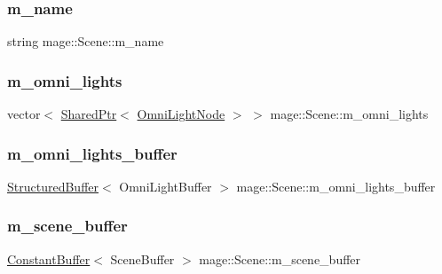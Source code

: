 \subsubsection{\texorpdfstring{m\+\_\+name}{m\_name}}
{\footnotesize\ttfamily string mage\+::\+Scene\+::m\+\_\+name\hspace{0.3cm}{\ttfamily [private]}}

\hypertarget{classmage_1_1_scene_a881c3dd7e85e5069650f29fd2722bf78}{}\label{classmage_1_1_scene_a881c3dd7e85e5069650f29fd2722bf78} 
\subsubsection{\texorpdfstring{m\+\_\+omni\+\_\+lights}{m\_omni\_lights}}
{\footnotesize\ttfamily vector$<$ \hyperlink{namespacemage_a1e01ae66713838a7a67d30e44c67703e}{Shared\+Ptr}$<$ \hyperlink{namespacemage_a1724c6e6b6b5ba535cdd967cbbb4a669}{Omni\+Light\+Node} $>$ $>$ mage\+::\+Scene\+::m\+\_\+omni\+\_\+lights\hspace{0.3cm}{\ttfamily [private]}}

\hypertarget{classmage_1_1_scene_a274ed5e548431ba805513a86a00bbaf1}{}\label{classmage_1_1_scene_a274ed5e548431ba805513a86a00bbaf1} 
\subsubsection{\texorpdfstring{m\+\_\+omni\+\_\+lights\+\_\+buffer}{m\_omni\_lights\_buffer}}
{\footnotesize\ttfamily \hyperlink{structmage_1_1_structured_buffer}{Structured\+Buffer}$<$ Omni\+Light\+Buffer $>$ mage\+::\+Scene\+::m\+\_\+omni\+\_\+lights\+\_\+buffer\hspace{0.3cm}{\ttfamily [private]}}

\hypertarget{classmage_1_1_scene_a8b883db7e3f4d2ac1212a99e38388b08}{}\label{classmage_1_1_scene_a8b883db7e3f4d2ac1212a99e38388b08} 
\subsubsection{\texorpdfstring{m\+\_\+scene\+\_\+buffer}{m\_scene\_buffer}}
{\footnotesize\ttfamily \hyperlink{structmage_1_1_constant_buffer}{Constant\+Buffer}$<$ Scene\+Buffer $>$ mage\+::\+Scene\+::m\+\_\+scene\+\_\+buffer\hspace{0.3cm}{\ttfamily [private]}}

